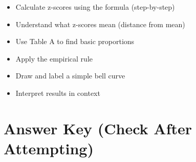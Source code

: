 \documentclass[11pt]{article}
\begin{document}
\begin{itemize}[label=$\square$]
    \item Calculate z-scores using the formula (step-by-step)
    \item Understand what z-scores mean (distance from mean)
    \item Use Table A to find basic proportions
    \item Apply the empirical rule
    \item Draw and label a simple bell curve
    \item Interpret results in context
\end{itemize}

\vspace{0.3in}

\section*{Answer Key (Check After Attempting)}
\end{document}
